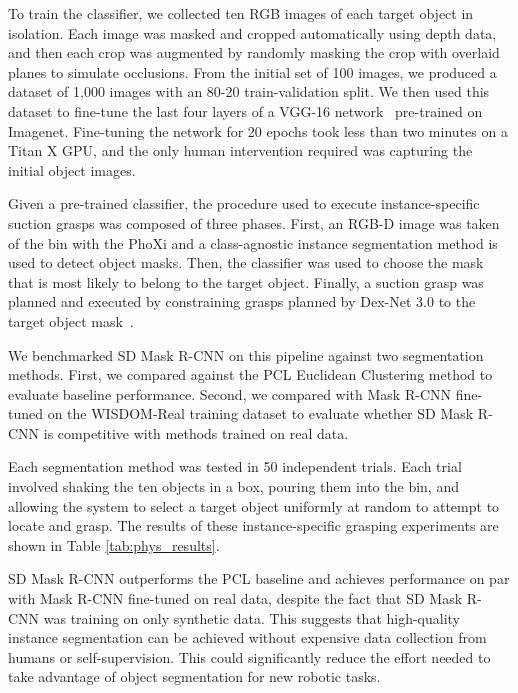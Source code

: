 \documentclass[letterpaper, 10 pt, conference]{ieeeconf}  \pdfoutput=1
\numberwithin{equation}{section}
\begin{document}
To train the classifier, we collected ten RGB images of each target object in isolation.
Each image was masked and cropped automatically using depth data, and then each crop was augmented by randomly masking the crop with overlaid planes to simulate occlusions.
From the initial set of 100 images, we produced a dataset of 1,000 images with an 80-20 train-validation split.
We then used this dataset to fine-tune the last four layers of a VGG-16 network~\cite{simonyan2014very} pre-trained on Imagenet.
Fine-tuning the network for 20 epochs took less than two minutes on a Titan X GPU, and the only human intervention required
was capturing the initial object images.

Given a pre-trained classifier, the procedure used to execute instance-specific suction grasps was composed of three phases.
First, an RGB-D image was taken of the bin with the PhoXi and a class-agnostic instance segmentation method is used to detect object masks.
Then, the classifier was used to choose the mask that is most likely to belong to the target object.
Finally, a suction grasp was planned and executed by constraining grasps planned by Dex-Net 3.0 to the target object mask~\cite{mahler2017dex}.

We benchmarked SD Mask R-CNN on this pipeline against two segmentation methods.
First, we compared against the PCL Euclidean Clustering method to evaluate baseline performance.
Second, we compared with Mask R-CNN fine-tuned on the WISDOM-Real training dataset to evaluate whether SD Mask R-CNN is competitive with methods trained on real data.

Each segmentation method was tested in 50 independent trials.
Each trial involved shaking the ten objects in a box, pouring them into the bin, and allowing the system to select a target object uniformly at random to attempt to locate and grasp.
The results of these instance-specific grasping experiments are shown in Table \ref{tab:phys_results}.

SD Mask R-CNN outperforms the PCL baseline and achieves performance on par with Mask R-CNN fine-tuned on real data, despite the fact that SD Mask R-CNN was training on only synthetic data.
This suggests that high-quality instance segmentation can be achieved without expensive data collection from humans or self-supervision.
This could significantly reduce the effort needed to take advantage of object segmentation for new robotic tasks.
 


  
\end{document}
